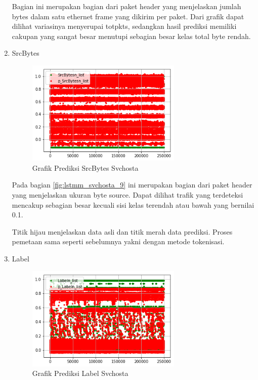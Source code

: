 \documentclass[./skripsi.tex]{subfiles}
\begin{document}
\begin{enumerate}
    \par Bagian ini merupakan bagian dari paket header yang menjelaskan jumlah bytes dalam satu ethernet frame yang dikirim per paket. Dari grafik dapat dilihat variasinya menyerupai totpkts, sedangkan hasil prediksi memiliki cakupan yang sangat besar menutupi sebagian besar kelas total byte rendah.
    
    \item SrcBytes
    \begin{figure}%
        \centering
        \includegraphics[width=0.7\textwidth]{public/assets/img/lstmm_svchosta_pred9.png}
        \caption{Grafik Prediksi SrcBytes Svchosta}
        \label{fig:lstmm_svchosta_pred9}
    \end{figure}
    
    \par Pada bagian \ref{fig:lstmm_svchosta_9} ini merupakan bagian dari paket header yang menjelaskan ukuran byte source. Dapat dilihat trafik yang terdeteksi mencakup sebagian besar kecuali sisi kelas terendah atau bawah yang bernilai 0.1.
    \par Titik hijau menjelaskan data asli dan titik merah data prediksi. Proses pemetaan sama seperti sebelumnya yakni dengan metode tokenisasi.
    
    \item Label
    \begin{figure}%
        \centering
        \includegraphics[width=0.7\textwidth]{public/assets/img/lstmm_svchosta_pred10.png}
        \caption{Grafik Prediksi Label Svchosta}
        \label{fig:lstmm_svchosta_pred10}
    \end{figure}
    

\end{enumerate}
\end{document}
